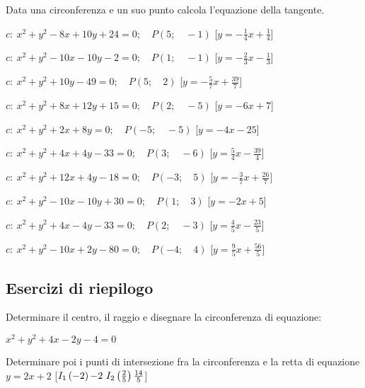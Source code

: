 \begin{esercizio}\label{ese:}
 Data una circonferenza e un suo punto calcola l'equazione della tangente.
 \begin{enumeratea}
  \item  \(c:~x^2 + y^2 -8x +10y +24 = 0; \quad P \left (5; \quad -1 \right )\)
   \hfill [\(y = -\frac{1}{4} x +\frac{1}{4}\)]
  \item  \(c:~x^2 + y^2 -10x -10y -2 = 0; \quad P \left (1; \quad -1 \right )\)
   \hfill [\(y = -\frac{2}{3} x -\frac{1}{3}\)]
  \item  \(c:~x^2 + y^2 +10y -49 = 0; \quad P \left (5; \quad 2 \right )\)
   \hfill [\(y = -\frac{5}{7} x +\frac{39}{7}\)]
  \item  \(c:~x^2 + y^2 +8x +12y +15 = 0; \quad P \left (2; \quad -5 \right )\)
   \hfill [\(y = -6 x +7\)]
  \item  \(c:~x^2 + y^2 +2x +8y  = 0; \quad P \left (-5; \quad -5 \right )\)
   \hfill [\(y = -4 x -25\)]
  \item  \(c:~x^2 + y^2 +4x +4y -33 = 0; \quad P \left (3; \quad -6 \right )\)
   \hfill [\(y = \frac{5}{4} x -\frac{39}{4}\)]
  \item  \(c:~x^2 + y^2 +12x +4y -18 = 0; \quad P \left (-3; \quad 5 \right )\)
   \hfill [\(y = -\frac{3}{7} x +\frac{26}{7}\)]
  \item  \(c:~x^2 + y^2 -10x -10y +30 = 0; \quad P \left (1; \quad 3 \right )\)
   \hfill [\(y = -2 x +5\)]
  \item  \(c:~x^2 + y^2 +4x -4y -33 = 0; \quad P \left (2; \quad -3 \right )\)
   \hfill [\(y = \frac{4}{5} x -\frac{23}{5}\)]
  \item  \(c:~x^2 + y^2 -10x +2y -80 = 0; \quad P \left (-4; \quad 4 \right )\)
   \hfill [\(y = \frac{9}{5} x +\frac{56}{5}\)]
 \end{enumeratea}
\end{esercizio}


\subsection{Esercizi di riepilogo}

\begin{esercizio}\label{ese:}
Determinare il centro, il raggio e disegnare la circonferenza di equazione:

\(x^2+y^2+4x-2y-4=0\)

Determinare poi i punti di intersezione fra la circonferenza e la retta di 
equazione 
\(y=2x+2\) 
\hfill [\(I_1\left( -2 \right){-2}~I_2\left( \frac{2}{5} \right){\frac{14}{5}}\)]
\end{esercizio}

